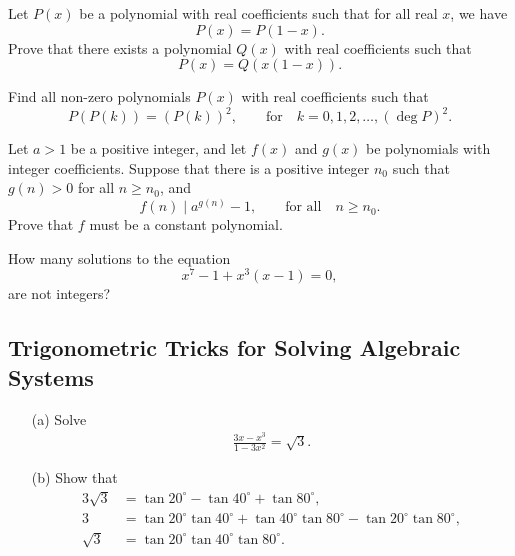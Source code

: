 \begin{question}[name={2010 Switzerland TST}]
    Let $P(x)$ be a polynomial with real coefficients such that for all real $x$, we have \[P(x)=P(1-x).\] Prove that there exists a polynomial $Q(x)$ with real coefficients such that \[P(x)=Q\left(x(1-x)\right).\]
\end{question}



\begin{question}[name={2011 Switzerland TST}]
    Find all non-zero polynomials $P(x)$ with real coefficients such that
    \[P(P(k))=\left(P(k)\right)^2,\qquad \text{for} \quad k=0,1,2,\dots,(\deg P)^2.\]
\end{question}



\begin{question}[name={2011 Switzerland TST}]
    Let $a>1$ be a positive integer, and let $f(x)$ and $g(x)$ be polynomials with integer coefficients. Suppose that there is a positive integer $n_0$ such that $g(n)>0$ for all $n\geq n_0$, and
    \[f(n) \mid a^{g(n)}-1, \qquad \text{for all} \quad n \geq n_0.\]
    Prove that $f$ must be a constant polynomial.
\end{question}


\begin{question}[name={2007 Ecuador TST}]
    How many solutions to the equation \[x^7-1+x^3(x-1)=0,\] are not integers?
\end{question}


\subsection{Trigonometric Tricks for Solving Algebraic Systems}



\begin{tcolorbox}
\begin{question}
\begin{itemize}
    \item[(a)] Solve
\begin{align*}
    \frac{3x-x^3}{1-3x^2} = \sqrt 3.
\end{align*}
    \item[(b)] Show that
    \begin{align*}
        3 \sqrt 3 &= \tan 20^\circ - \tan 40^\circ + \tan 80^\circ,\\
        3 &= \tan 20^\circ \tan 40^\circ + \tan 40^\circ \tan 80^\circ - \tan 20^\circ\tan 80^\circ,\\
        \sqrt 3 &= \tan 20^\circ \tan 40^\circ \tan 80^\circ.
    \end{align*}
\end{itemize}
\end{question}
\end{tcolorbox}

